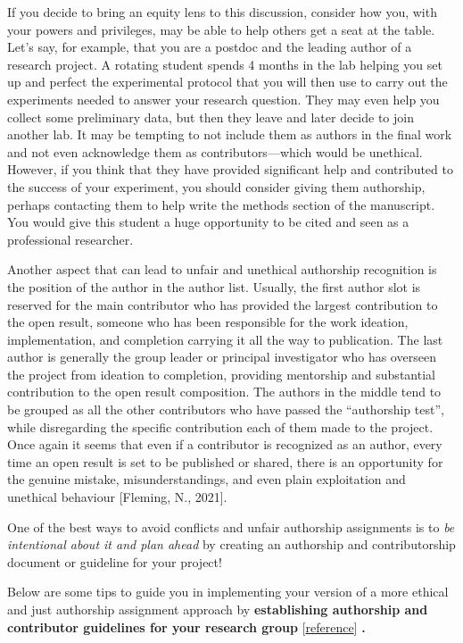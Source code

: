 \documentclass[
  letterpaper,
  DIV=11,
  numbers=noendperiod]{scrreport}
\begin{document}
If you decide to bring an equity lens to this discussion, consider how
you, with your powers and privileges, may be able to help others get a
seat at the table. Let's say, for example, that you are a postdoc and
the leading author of a research project. A rotating student spends 4
months in the lab helping you set up and perfect the experimental
protocol that you will then use to carry out the experiments needed to
answer your research question. They may even help you collect some
preliminary data, but then they leave and later decide to join another
lab. It may be tempting to not include them as authors in the final work
and not even acknowledge them as contributors---which would be
unethical. However, if you think that they have provided significant
help and contributed to the success of your experiment, you should
consider giving them authorship, perhaps contacting them to help write
the methods section of the manuscript. You would give this student a
huge opportunity to be cited and seen as a professional researcher.

Another aspect that can lead to unfair and unethical authorship
recognition is the position of the author in the author list. Usually,
the first author slot is reserved for the main contributor who has
provided the largest contribution to the open result, someone who has
been responsible for the work ideation, implementation, and completion
carrying it all the way to publication. The last author is generally the
group leader or principal investigator who has overseen the project from
ideation to completion, providing mentorship and substantial
contribution to the open result composition. The authors in the middle
tend to be grouped as all the other contributors who have passed the
``authorship test'', while disregarding the specific contribution each
of them made to the project. Once again it seems that even if a
contributor is recognized as an author, every time an open result is set
to be published or shared, there is an opportunity for the genuine
mistake, misunderstandings, and even plain exploitation and unethical
behaviour {[}Fleming, N., 2021{]}.

One of the best ways to avoid conflicts and unfair authorship
assignments is to \emph{be intentional about it and plan ahead} by
creating an authorship and contributorship document or guideline for
your project!

Below are some tips to guide you in implementing your version of a more
ethical and just authorship assignment approach by \textbf{establishing
authorship and contributor guidelines for your research group}
{[}\href{https://the-turing-way.netlify.app/communication/aa/aa-tips.html}{reference}{]}
\textbf{.}
\end{document}
